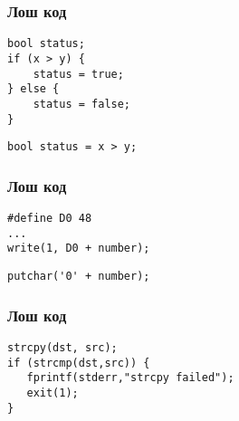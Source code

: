 \begin{frame}[fragile]
  \frametitle{Лош код}\pause

\begin{minipage}[t]{0.48\linewidth}
\begin{lstlisting}
bool status;
if (x > y) {
    status = true;
} else {
    status = false;
}
\end{lstlisting}\pause
\end{minipage}\hfill
\begin{minipage}[t]{0.48\linewidth}
\begin{lstlisting}
bool status = x > y;
\end{lstlisting}
\end{minipage}
\end{frame}



\begin{frame}[fragile]
  \frametitle{Лош код}\pause
\begin{minipage}[t]{0.48\linewidth}
\begin{lstlisting}
#define D0 48
...
write(1, D0 + number);
\end{lstlisting}\pause
\end{minipage}\hfill
\begin{minipage}[t]{0.48\linewidth}
\begin{lstlisting}
putchar('0' + number);
\end{lstlisting}
\end{minipage}
\end{frame}


\begin{frame}[fragile]
  \frametitle{Лош код}\pause
\begin{lstlisting}
strcpy(dst, src);
if (strcmp(dst,src)) {
   fprintf(stderr,"strcpy failed");
   exit(1);
}
\end{lstlisting}
\end{frame}

